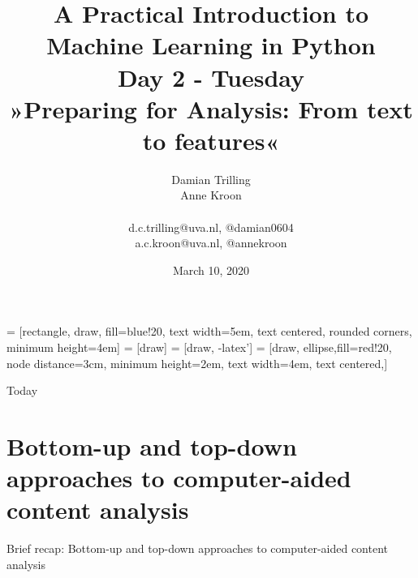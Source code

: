 \documentclass{beamer}
\begin{document}
\title[Big Data and Automated Content Analysis]{\textbf{A Practical Introduction to Machine Learning in Python} \\Day 2 - Tuesday \\ »Preparing for Analysis: From text to features«}
\author[Damian Trilling, Anne Kroon]{Damian Trilling \\ Anne Kroon \\ ~ \\ \footnotesize{d.c.trilling@uva.nl, @damian0604 \\a.c.kroon@uva.nl, @annekroon} \\}
\date{March 10, 2020}


 = [rectangle, draw, fill=blue!20, 
text width=5em, text centered, rounded corners, minimum height=4em]
 = [draw]
 = [draw, -latex']
 = [draw, ellipse,fill=red!20, node distance=3cm,
minimum height=2em, text width=4em, text centered,]




\begin{frame}{}
\titlepage
\end{frame}

\begin{frame}{Today}
\tableofcontents
\end{frame}

\section{Bottom-up and top-down approaches to computer-aided content analysis}

\begin{frame}[plain]
Brief recap: Bottom-up and top-down approaches to computer-aided content analysis
\end{frame}

\begin{frame}[plain]
\end{frame}
\end{document}
